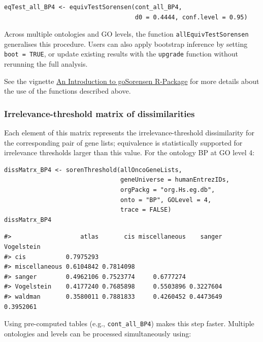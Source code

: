 \begin{verbatim}
eqTest_all_BP4 <- equivTestSorensen(cont_all_BP4,
                                    d0 = 0.4444, conf.level = 0.95)
\end{verbatim}

Across multiple ontologies and GO levels, the function \texttt{allEquivTestSorensen} generalises this procedure. Users can also apply bootstrap inference by setting \texttt{boot\ =\ TRUE}, or update existing results with the \texttt{upgrade} function without rerunning the full analysis.

See the vignette \href{https://www.bioconductor.org/packages/release/bioc/vignettes/goSorensen/inst/doc/goSorensen_Introduction.html}{An Introduction to goSorensen R-Package} for more details about the use of the functions described above.

\hypertarget{irrelevance-threshold-matrix-of-dissimilarities}{%
\subsubsection{Irrelevance-threshold matrix of dissimilarities}\label{irrelevance-threshold-matrix-of-dissimilarities}}

Each element of this matrix represents the irrelevance-threshold dissimilarity for the corresponding pair of gene lists; equivalence is statistically supported for irrelevance thresholds larger than this value. For the ontology BP at GO level 4:

\begin{verbatim}
dissMatrx_BP4 <- sorenThreshold(allOncoGeneLists,
                                geneUniverse = humanEntrezIDs, 
                                orgPackg = "org.Hs.eg.db",
                                onto = "BP", GOLevel = 4,
                                trace = FALSE)
dissMatrx_BP4
\end{verbatim}

\begin{verbatim}
#>                   atlas       cis miscellaneous    sanger Vogelstein
#> cis           0.7975293                                             
#> miscellaneous 0.6104842 0.7814098                                   
#> sanger        0.4962106 0.7523774     0.6777274                     
#> Vogelstein    0.4177240 0.7685898     0.5503896 0.3227604           
#> waldman       0.3580011 0.7881833     0.4260452 0.4473649  0.3952061
\end{verbatim}

Using pre-computed tables (e.g., \texttt{cont\_all\_BP4}) makes this step faster. Multiple ontologies and levels can be processed simultaneously using:

